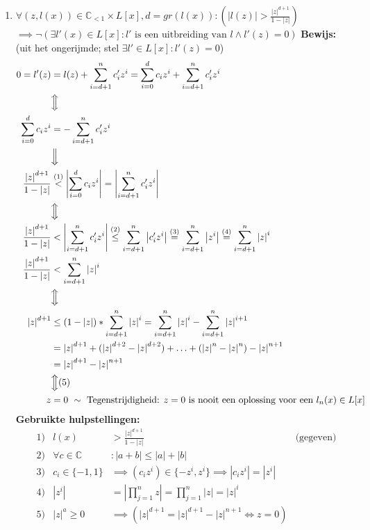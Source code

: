 \documentclass{article}
\begin{document}
\begin{enumerate}
\item \underline{$\forall (z, l(x)) \in \mathbb{C}_{<1} \times L[x], d = gr(l(x)): (|l(z)| > \frac{|z|^{d+1}}{1 - |z|})$} \newline \underline{$\implies \neg(\exists l'(x) \in L[x]: l' \text{ is een uitbreiding van } l \land l'(z) = 0)$} \newline
\textbf{Bewijs:} (uit het ongerijmde; stel $\exists l' \in L[x]: l'(z) = 0$)
\begin{align*}
 0 = l'(z) &= l(z) + \sum_{i=d+1}^{n}{c'_iz^i}
 = \sum_{i=0}^{d}{c_iz^i} + \sum_{i=d+1}^{n}{c'_iz^i} \\
 &\Big\Updownarrow \\
 \sum_{i=0}^{d}{c_iz^i} &= -\sum_{i=d+1}^{n}{c'_iz^i} \\
 &\Big\Downarrow \\
 \frac{\left|z\right|^{d+1}}{1-\left|z\right|} &\sgntxt{<}{(1)} \left|\sum_{i=0}^{d}{c_iz^i}\right| = \left|\sum_{i=d+1}^{n}{c'_iz^i}\right| \\
 &\Big\Updownarrow \\
 \frac{\left|z\right|^{d+1}}{1-\left|z\right|} &< \left|\sum_{i=d+1}^{n}{c'_iz^i}\right|
 \sgntxt{\leq}{(2)} \sum_{i=d+1}^{n}{\left|c'_iz^i\right|}
 \sgntxt{=}{(3)} \sum_{i=d+1}^{n}{\left|z^i\right|}
 \sgntxt{=}{(4)} \sum_{i=d+1}^{n}{\left|z\right|^i} \\
 \frac{\left|z\right|^{d+1}}{1-\left|z\right|} &< \sum_{i=d+1}^{n}{\left|z\right|^i} \\
 &\Big\Updownarrow \\
 \left|z\right|^{d+1} &\leq (1-\left|z\right|) * \sum_{i=d+1}^{n}{\left|z\right|^i}
 = \sum_{i=d+1}^{n}{\left|z\right|^i} - \sum_{i=d+1}^{n}{\left|z\right|^{i+1}} \\
 &= \left|z\right|^{d+1} + (\left|z\right|^{d+2} - \left|z\right|^{d+2}) + \mathellipsis + (\left|z\right|^{n} - \left|z\right|^{n}) - \left|z\right|^{n+1} \\
 &= \left|z\right|^{d+1} - \left|z\right|^{n+1} \\
 &\Big\Updownarrow (5) \\
 z &= 0 \text{ }\sim\text{ Tegenstrijdigheid: } z=0 \text{ is nooit een oplossing voor een } l_n(x) \in L[x]
\end{align*}
\textbf{Gebruikte hulpstellingen:}
\begin{align*}
& \text{1)} & l(x) &> \frac{\left|z\right|^{d+1}}{1 - \left|z\right|} &\text{(gegeven)}\\
& \text{2)} & \forall c \in \mathbb{C} &: \left|a+b\right| \leq \left|a\right| + \left|b\right|\\
& \text{3)} & c_i \in \{-1, 1\} &\implies (c_iz^i) \in \{-z^i, z^i\} \implies \left|c_iz^i\right| = \left|z^i\right| \\
& \text{4)} & \left|z^i\right| &= \left|\prod_{j=1}^{n}{z}\right| = \prod_{j=1}^{n}{\left|z\right|} = \left|z\right|^i \\
& \text{5)} & \left|z\right|^a \geq 0 &\implies (\left|z\right|^{d+1} = \left|z\right|^{d+1} - \left|z\right|^{n+1} \iff z = 0)
\end{align*}
\end{enumerate}
\end{document}
